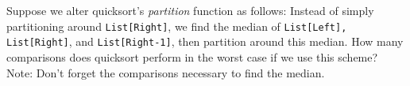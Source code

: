 Suppose we alter quicksort's {\em partition} function as follows:  Instead of 
simply partitioning around {\tt List[Right]}, we find the
median of {\tt List[Left], List[Right]}, and {\tt List[Right-1]},
then partition around this median.  How many 
comparisons does quicksort perform
in the worst case if we use this scheme?  Note: Don't forget
the comparisons necessary to find the median.
